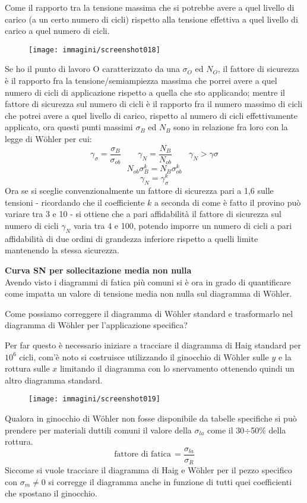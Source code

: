 \documentclass{article}
\begin{document}
\begin{adjustwidth}{2in}{}
			Come il rapporto tra la tensione massima che si potrebbe avere a quel livello di carico (a un certo numero di cicli) rispetto alla tensione effettiva a quel livello di carico a quel numero di cicli.  
			\begin{figure}[H]
				\centering
				\texttt{[image: immagini/screenshot018]}
				\label{fig:screenshot018}
			\end{figure}			
			Se ho il punto di lavoro O caratterizzato da una $\sigma_O$ ed $N_O$, il fattore di sicurezza è il rapporto fra la tensione/semiampiezza massima che porrei avere a quel numero di cicli di applicazione rispetto a quella che sto applicando; mentre il fattore di sicurezza sul numero di cicli è il rapporto fra il numero massimo di cicli che potrei avere a quel livello di carico, rispetto al numero di cicli effettivamente applicato, ora questi punti massimi $\sigma_B$ ed $N_B$ sono in relazione fra loro con la legge di Wöhler per cui:
			\[\gamma_\sigma = \dfrac{\sigma_B}{\sigma_{ob}} \qquad \gamma_N = \dfrac{N_B}{N_{ob}} \qquad \gamma_N>\gamma\sigma\]
			\[N_{ob}\sigma_B^k = N_B\sigma_{ob}^k\]
			\[\gamma_N=\gamma_\sigma^k\]			
			Ora se si sceglie convenzionalmente un fattore di sicurezza pari a 1,6 sulle tensioni - ricordando che il coefficiente $k$ a seconda di come è fatto il provino può variare tra 3 e 10 - si ottiene che a pari affidabilità il fattore di sicurezza sul numero di cicli $\gamma_N$ varia tra 4 e 100, potendo imporre un numero di cicli a pari affidabilità di due ordini di grandezza inferiore rispetto a quelli limite mantenendo la stessa sicurezza. \newline
			
			\textbf{{\LARGE Curva SN per sollecitazione media non nulla}} \\
			Avendo visto i diagrammi di fatica più comuni si è ora in grado di quantificare come impatta un valore di tensione media non nulla sul diagramma di Wöhler. \newline
			
			Come possiamo correggere il diagramma di Wöhler standard e trasformarlo nel diagramma di Wöhler per l'applicazione specifica?
			
			Per far questo è necessario iniziare a tracciare il diagramma di Haig standard per $10^6$ cicli, com'è noto si costruisce utilizzando il ginocchio di Wöhler sulle $y$ e la rottura sulle $x$ limitando il diagramma con lo snervamento ottenendo quindi un altro diagramma standard. 
\begin{figure}[H]
	\centering
	\label{fig:screenshot019}
	\texttt{[image: immagini/screenshot019]}
\end{figure}
			Qualora in ginocchio di Wöhler non fosse disponibile da tabelle specifiche si può prendere per materiali duttili comuni il valore della $\sigma_{la}$ come il 30$\div$50\% della rottura. 
			\[\text{fattore di fatica}\,=\dfrac{\sigma_{la}}{\sigma_R}\] 						
			Siccome si vuole tracciare il diagramma di Haig e Wöhler per il pezzo specifico con $\sigma_m\ne0$ si corregge il diagramma anche in funzione di tutti quei coefficienti che spostano il ginocchio.
			

\end{adjustwidth}
\end{document}
